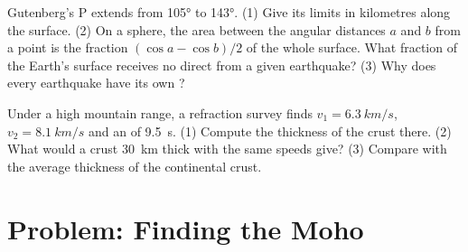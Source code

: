 \begin{exercise}[$\star\star\star$]\label{exo:g11:seismic-structure:14}
Gutenberg's P  extends from \ang{105} to \ang{143}. (1) Give its
limits in kilometres along the surface. (2) On a sphere, the area between the
angular distances $a$ and $b$ from a point is the fraction $(\cos a - \cos
b)/2$ of the whole surface. What fraction of the Earth's surface receives no
direct  from a given earthquake? (3) Why does every earthquake have its
own ?
\end{exercise}

\begin{exercise}[$\star\star\star$]\label{exo:g11:seismic-structure:15}
Under a high mountain range, a refraction survey finds $v_1 =
\qty{6.3}{km/s}$, $v_2 = \qty{8.1}{km/s}$ and an  of
\qty{9.5}{s}. (1) Compute the thickness of the crust there. (2) What
 would a crust \qty{30}{km} thick with the same speeds give?
(3) Compare with the average thickness of the continental crust.
\end{exercise}

\section{Problem: Finding the Moho}

